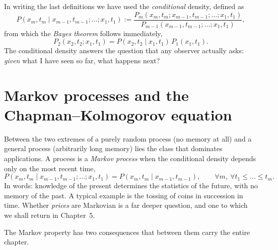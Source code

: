 In writing the last definitions we have used the \emph{conditional} density, defined as
\begin{equation}
P(x_m,t_m\mid x_{m-1},t_{m-1};\dots;x_1,t_1) := \frac{P_m(x_m,t_m;x_{m-1},t_{m-1};\dots;x_1,t_1)}{P_{m-1}(x_{m-1},t_{m-1};\dots;x_1,t_1)},
\end{equation}
from which the \emph{Bayes theorem} follows immediately,
\begin{equation}
P_2(x_2,t_2;x_1,t_1) = P(x_2,t_2\mid x_1,t_1)\,P_1(x_1,t_1).
\end{equation}
The conditional density answers the question that any observer actually asks: \emph{given} what I have seen so far, what happens next?


\section{Markov processes and the Chapman--Kolmogorov equation}

Between the two extremes of a purely random process (no memory at all) and a general process (arbitrarily long memory) lies the class that dominates applications.
A process is a \emph{Markov process} when the conditional density depends only on the most recent time,
\begin{equation}
P(x_m,t_m\mid x_{m-1},t_{m-1};\dots;x_1,t_1) = P(x_m,t_m\mid x_{m-1},t_{m-1}),
\qquad \forall m,\ \forall t_1\le\dots\le t_m.
\end{equation}
In words: knowledge of the present determines the statistics of the future, with no memory of the past.
A typical example is the tossing of coins in succession in time.
Whether \emph{prices} are Markovian is a far deeper question, and one to which we shall return in Chapter~5.

The Markov property has two consequences that between them carry the entire chapter.

